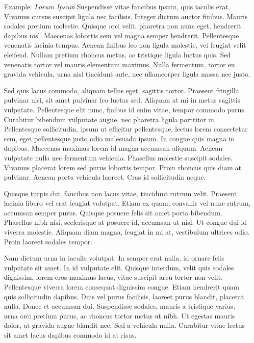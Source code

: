 \documentclass[a4paper, 11pt]{report}
\begin{document}
\begin{example}{Example: \textit{Lorum Ipsum}}
Suspendisse vitae faucibus ipsum, quis iaculis erat. Vivamus cursus suscipit ligula nec facilisis. Integer dictum auctor finibus. Mauris sodales pretium molestie. Quisque orci velit, pharetra non nunc eget, hendrerit dapibus nisl. Maecenas lobortis sem vel magna semper hendrerit. Pellentesque venenatis lacinia tempus. Aenean finibus leo non ligula molestie, vel feugiat velit eleifend. Nullam pretium rhoncus metus, ac tristique ligula luctus quis. Sed venenatis tortor vel mauris elementum maximus. Nulla fermentum, tortor eu gravida vehicula, urna nisl tincidunt ante, nec ullamcorper ligula massa nec justo.

Sed quis lacus commodo, aliquam tellus eget, sagittis tortor. Praesent fringilla pulvinar nisi, sit amet pulvinar leo luctus sed. Aliquam at mi in metus sagittis vulputate. Pellentesque elit nunc, finibus id enim vitae, tempor commodo purus. Curabitur bibendum vulputate augue, nec pharetra ligula porttitor in. Pellentesque sollicitudin, ipsum ut efficitur pellentesque, lectus lorem consectetur sem, eget pellentesque justo odio malesuada ipsum. In congue quis magna in dapibus. Maecenas maximus lorem id magna accumsan aliquam. Aenean vulputate nulla nec fermentum vehicula. Phasellus molestie suscipit sodales. Vivamus placerat lorem sed purus lobortis tempor. Proin rhoncus quis diam at pulvinar. Aenean porta vehicula laoreet. Cras id sollicitudin neque.

Quisque turpis dui, faucibus non lacus vitae, tincidunt rutrum velit. Praesent lacinia libero vel erat feugiat volutpat. Etiam ex quam, convallis vel nunc rutrum, accumsan semper purus. Quisque posuere felis sit amet porta bibendum. Phasellus nibh nisi, scelerisque at posuere id, accumsan ut nisl. Ut congue dui id viverra molestie. Aliquam diam magna, feugiat in mi at, vestibulum ultrices odio. Proin laoreet sodales tempor.

Nam dictum urna in iaculis volutpat. In semper erat nulla, id ornare felis vulputate sit amet. In id vulputate elit. Quisque interdum, velit quis sodales dignissim, lorem eros maximus lacus, vitae suscipit arcu tortor non velit. Pellentesque viverra lorem consequat dignissim congue. Etiam hendrerit quam quis sollicitudin dapibus. Duis vel purus facilisis, laoreet purus blandit, placerat nulla. Donec et accumsan dui. Suspendisse sodales, mauris a tristique varius, urna orci pretium purus, ac rhoncus tortor metus ut nibh. Ut egestas mauris dolor, ut gravida augue blandit nec. Sed a vehicula nulla. Curabitur vitae lectus sit amet lacus dapibus commodo id at risus.


\end{example}
\end{document}
